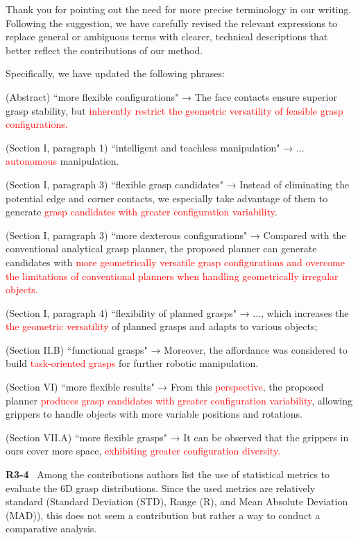 \documentclass[journal]{IEEEtran}
\newcommand{\rev}[1]{\textcolor{red}{#1}}
\begin{document}
Thank you for pointing out the need for more precise terminology in our writing. Following the suggestion, we have carefully revised the relevant expressions to replace general or ambiguous terms with clearer, technical descriptions that better reflect the contributions of our method.

Specifically, we have updated the following phrases:

(Abstract) ``more flexible configurations" → The face contacts ensure superior grasp stability, but \rev{inherently restrict the geometric versatility of feasible grasp configurations.}


(Section I, paragraph 1) ``intelligent and teachless manipulation"  → ... \rev{autonomous} manipulation.

(Section I, paragraph 3) ``flexible grasp candidates" → Instead of eliminating the potential edge and corner contacts, we especially take advantage of them to generate \rev{grasp candidates with greater configuration variability}. 

(Section I, paragraph 3) ``more dexterous configurations" → Compared with the conventional analytical grasp planner, the proposed planner can generate candidates with \rev{more geometrically versatile grasp configurations and overcome the limitations of conventional planners when handling geometrically irregular objects.}

(Section I, paragraph 4) ``flexibility of planned grasps" → ..., which increases the \rev{the geometric versatility} of planned grasps and adapts to various objects;

(Section II.B) ``functional grasps" → Moreover, the affordance was considered to build \rev{task-oriented grasps} for further robotic manipulation. 

(Section VI) ``more flexible results" → From this \rev{perspective}, the proposed planner \rev{produces grasp candidates with greater configuration variability}, allowing grippers to handle objects with more variable positions and rotations.

(Section VII.A) ``more flexible grasps" → It can be observed that the grippers in ours cover more space, \rev{exhibiting greater configuration diversity.}


\bigskip

\noindent
{\textbf{\color{black}R3-4}\color{gray}~
Among the contributions authors list the use of statistical metrics to evaluate the 6D grasp distributions. Since the used metrics are relatively standard (Standard Deviation (STD), Range (R), and Mean Absolute Deviation (MAD)), this does not seem a contribution but rather a way to conduct a comparative analysis.
}
\end{document}
